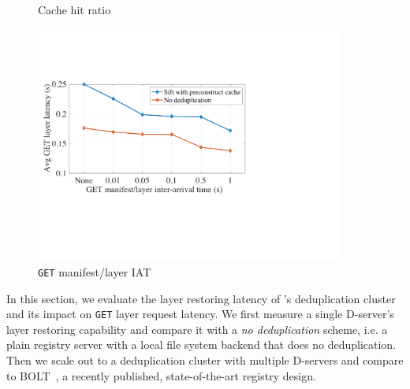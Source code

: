 \begin{figure}[t]
\begin{minipage}{0.3\textwidth}
		\caption{Cache hit ratio}%
		\label{fig:eval-cachehitratios}
	\end{minipage}%
	\begin{minipage}{0.3\textwidth}
	\centering
	\includegraphics[width=0.9\textwidth]{graphs/durationML.pdf}
	\caption{\texttt{GET} manifest/layer IAT}
	\label{fig:eval-durationML}
   \end{minipage}
\end{figure}

In this section, we evaluate the layer restoring latency of \sysname's deduplication cluster 
and its impact on \texttt{GET} layer request latency.
%
We first measure a single D-server's layer restoring capability and compare it with 
a \emph{no deduplication} scheme, i.e.  a plain registry server with a local file system backend
that does no deduplication.
%
Then we scale out to a deduplication cluster with multiple D-servers and compare
\sysname to BOLT~\cite{littley2019bolt}, a recently published, state-of-the-art registry design.
%
%
%

